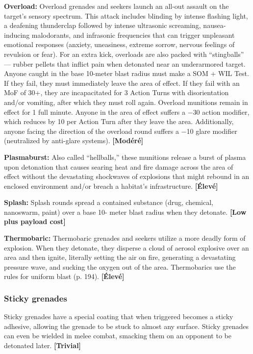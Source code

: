 {{\textbf{Overload:} Overload grenades and seekers launch an all-out assault on the target’s sensory spectrum. This attack includes blinding by intense flashing light, a deafening thunderclap followed by intense ultrasonic screaming, nausea-inducing malodorants, and infrasonic frequencies that can trigger unpleasant emotional responses (anxiety, uneasiness, extreme sorrow, nervous feelings of revulsion or fear). For an extra kick, overloads are also packed with ``stingballs'' --- rubber pellets that inflict pain when detonated near an underarmored target. Anyone caught in the base 10-meter blast radius must make a SOM + WIL Test. If they fail, they must immediately leave the area of effect. If they fail with an MoF of 30+, they are incapacitated for 3 Action Turns with disorientation and/or vomiting, after which they must roll again. Overload munitions remain in effect for 1 full minute. Anyone in the area of effect suffers a $-$30 action modifier, which reduces by 10 per Action Turn after they leave the area. Additionally, anyone facing the direction of the overload round suffers a $-$10 glare modifier (neutralized by anti-glare systems). \textbf{[Modéré]} 

\textbf{Plasmaburst:} Also called ``hellballs,'' these munitions release a burst of plasma upon detonation that causes searing heat and fire damage across the area of effect without the devastating shockwaves of explosions that might rebound in an enclosed environment and/or breach a habitat’s infrastructure. \textbf{[Élevé]} 

\textbf{Splash:} Splash rounds spread a contained substance (drug, chemical, nanoswarm, paint) over a base 10- meter blast radius when they detonate. \textbf{[Low plus payload cost]} 

\textbf{Thermobaric:} Thermobaric grenades and seekers utilize a more deadly form of explosion. When they detonate, they disperse a cloud of aerosol explosive over an area and then ignite, literally setting the air on fire, generating a devastating pressure wave, and sucking the oxygen out of the area. Thermobarics use the rules for uniform blast (p. 194). \textbf{[Élevé]} 

\subsubsection{Sticky grenades} 

Sticky grenades have a special coating that when triggered becomes a sticky adhesive, allowing the grenade to be stuck to almost any surface. Sticky grenades can even be wielded in melee combat, smacking them on an opponent to be detonated later. \textbf{[Trivial]} 

}}
